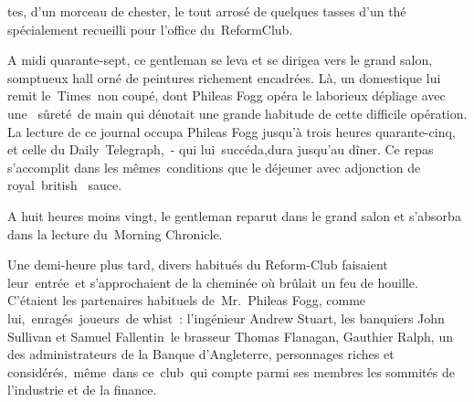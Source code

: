\documentclass[]{book}
\begin{document}
               tes, d'un morceau de chester, le tout arrosé de quelques tasses d'un thé spécialement recueilli pour l'office du ReformClub.
               
               A midi quarante-sept, ce gentleman se
               leva et se dirigea vers le grand salon,
               somptueux hall orné de peintures richement encadrées. Là, un domestique lui
               remit le Times non coupé, dont Phileas 
               Fogg opéra le laborieux dépliage avec une 
               sûreté de main qui dénotait une grande
               habitude de cette difficile opération. La
               lecture de ce journal occupa Phileas Fogg
               jusqu'à trois heures quarante-cinq, et celle
               du Daily Telegraph, - qui lui succéda,dura jusqu'au dîner. Ce repas s'accomplit
               dans les mêmes conditions que le déjeuner avec adjonction de royal british 
               sauce.
            
               A huit heures moins vingt, le gentleman
               reparut dans le grand salon et s'absorba
               dans la lecture du Morning Chronicle.
            
               Une demi-heure plus tard, divers habitués du Reform-Club faisaient leur entrée et s'approchaient de la cheminée où 
               brûlait un feu de houille. C'étaient les
               partenaires habituels de Mr. Phileas Fogg,
               comme lui, enragés joueurs de whist :
               l'ingénieur Andrew Stuart, les banquiers 
               John Sullivan et Samuel Fallentin le 
               brasseur Thomas Flanagan, Gauthier 
               Ralph, un des administrateurs de la Banque d'Angleterre, personnages riches et
               considérés, même dans ce club qui compte
               parmi ses membres les sommités de l'industrie et de la finance.
            
\end{document}
